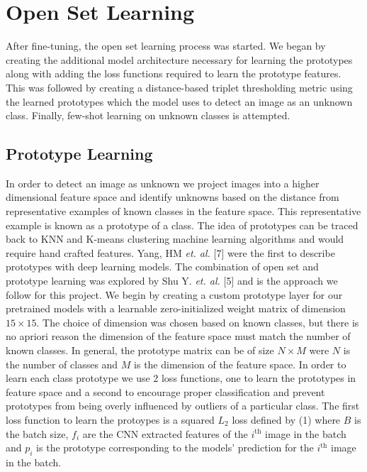 \documentclass[conference]{IEEEtran}
\begin{document}
\section{Open Set Learning}

After fine-tuning, the open set learning process was started. We began by creating the additional model architecture necessary for learning the prototypes along with adding the loss functions required to learn the prototype features. This was followed by creating a distance-based triplet thresholding metric using the learned prototypes which the model uses to detect an image as an unknown class. Finally, few-shot learning on unknown classes is attempted.

\subsection{Prototype Learning}

In order to detect an image as unknown we project images into a higher dimensional feature space and identify unknowns based on the distance from representative examples of known classes in the feature space. This representative example is known as a prototype of a class. The idea of prototypes can be traced back to KNN and K-means clustering machine learning algorithms and would require hand crafted features. Yang, HM \textit{et. al.} [7] were the first to describe prototypes with deep learning models. The combination of open set and prototype learning was explored by Shu Y. \textit{et. al.} [5] and is the approach we follow for this project. We begin by creating a custom prototype layer for our pretrained models with a learnable zero-initialized weight matrix of dimension $15 \times 15$. The choice of dimension was chosen based on known classes, but there is no apriori reason the dimension of the feature space must match the number of known classes. In general, the prototype matrix can be of size $N \times M$ were $N$ is the number of classes and $M$ is the dimension of the feature space. In order to learn each class prototype we use 2 loss functions, one to learn the prototypes in feature space and a second to encourage proper classification and prevent prototypes from being overly influenced by outliers of a particular class. The first loss function to learn the protoypes is a squared $L_2$ loss defined by (1) where $B$ is the batch size, $f_i$ are the CNN extracted features of the $i^{\text{th}}$ image in the batch and $p_i$ is the prototype corresponding to the models' prediction for the $i^{\text{th}}$ image in the batch.
\end{document}
